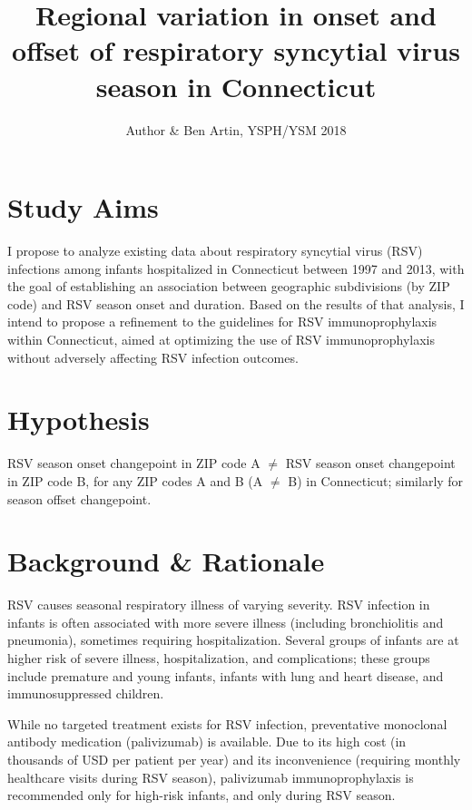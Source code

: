 \documentclass{article}
\title{Regional variation in onset and offset of respiratory syncytial virus season in Connecticut}
\author{Author & Ben Artin, YSPH/YSM 2018}
\renewcommand{\cite}[1]{\autocite{#1}}
\begin{document}
\maketitle

\section{Study Aims}

I propose to analyze existing data about respiratory syncytial virus (RSV) infections among infants hospitalized in Connecticut between 1997 and 2013, with the goal of establishing an association between geographic subdivisions (by ZIP code) and RSV season onset and duration. Based on the results of that analysis, I intend to propose a refinement to the guidelines for RSV immunoprophylaxis within Connecticut, aimed at optimizing the use of RSV immunoprophylaxis without adversely affecting RSV infection outcomes.

\section{Hypothesis}

RSV season onset changepoint in ZIP code A $\neq$ RSV season onset changepoint in ZIP code B, for any ZIP codes A and B (A $\neq$ B) in Connecticut; similarly for season offset changepoint.

\section{Background \& Rationale}

RSV causes seasonal respiratory illness of varying severity. RSV infection in infants is often associated with more severe illness (including bronchiolitis and pneumonia), sometimes requiring hospitalization. Several groups of infants are at higher risk of severe illness, hospitalization, and complications; these groups include premature and young infants, infants with lung and heart disease, and immunosuppressed children. \cite{CentersforDiseaseControlandPrevention:368RENtm}

While no targeted treatment exists for RSV infection, preventative monoclonal antibody medication (palivizumab) is available. Due to its high cost (in thousands of USD per patient per year) and its inconvenience (requiring monthly healthcare visits during RSV season), palivizumab immunoprophylaxis is recommended only for high-risk infants, and only during RSV season. \cite{AmericanAcademyofPediatricsCommitteeonInfectiousDiseases:2014bj,AmericanAcademyofPediatricsCommitteeonInfectiousDiseasesandCommitteeonFetusandNewborn:2003ug}
\end{document}
